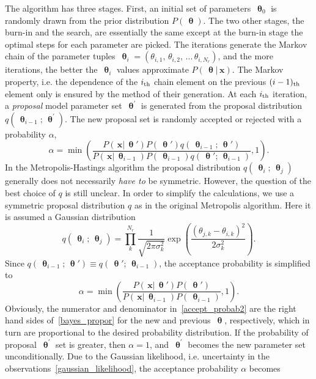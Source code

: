 \documentclass[preprint2]{aastex}
\newcommand{\bfx}{\,\mathbf{x}}
\newcommand{\bfth}{\,\bm{\uptheta}}
\begin{document}
The algorithm has three stages. First, an initial set of parameters $\bfth_0$ is randomly drawn from the prior distribution $P(\bfth)$. The two other stages, the burn-in and the search, are essentially the same except at the burn-in stage the optimal steps for each parameter are picked. The iterations generate the Markov chain of the parameter tuples $\bfth_i = \left(\theta_{i,1},\, \theta_{i,2},\, ...\, \theta_{i,N_r} \right)$, and the more iterations, the better the $\bfth_i$ values approximate $P(\bfth|\bfx)$. The Markov property, i.e. the dependence of the $i_{\rm th}$ chain element on the previous $(i-1)_{\rm th}$ element only is ensured by the method of their generation. At each $i_{\rm th}$ iteration, a \emph{proposal} model parameter set $\bfth^\prime$ is generated from the proposal distribution $q(\bfth_{i-1};\bfth^\prime)$. The new proposal set is randomly accepted or rejected with a probability $\alpha$,
\begin{equation}
  \label{accept_probab}
  \alpha =  \min \left( \frac{P(\bfx|\bfth')P(\bfth')q(\bfth_{i-1};\bfth')} 
            {P(\bfx|\bfth_{i-1})P(\bfth_{i-1})q(\bfth';\bfth_{i-1})}, 1 \right).
\end{equation}
In the Metropolis-Hastings algorithm the proposal distribution $q(\bfth_i;\bfth_j)$ generally does not necessarily \emph{have to} be symmetric. However, the question of the best choice of $q$ is still unclear. In order to simplify the calculations, we use a symmetric proposal distribution $q$ as in the original Metropolis algorithm. Here it is  assumed a Gaussian distribution
\begin{equation}
  \label{gaussian_prop_distr}
  q(\bfth_i;\bfth_j) = \prod^{N_r}_{k} \frac{1}{\sqrt{2 \pi \sigma^2_k}} 
                   \exp \left( \frac{(\theta_{j,k} - \theta_{i,k})^2}{2 \sigma^2_k} \right).
\end{equation}
Since $q(\bfth_{i-1};\bfth') \equiv q(\bfth';\bfth_{i-1})$, the acceptance probability is simplified to
\begin{equation}
  \label{accept_probab2}
  \alpha =  \min \left( \frac{P(\bfx|\bfth')P(\bfth')} {P(\bfx|\bfth_{i-1})P(\bfth_{i-1})}, 1 \right).
\end{equation}
Obviously, the numerator and denominator in~\eqref{accept_probab2} are the right hand sides of~\eqref{bayes_propor} for the new and previous $\bfth$, respectively, which in turn are proportional to the desired probability distribution. If the probability of proposal $\bfth^\prime$ set is greater, then $\alpha = 1$, and $\bfth^\prime$ becomes the new parameter set unconditionally. Due to the Gaussian likelihood, i.e. uncertainty in the observations~\eqref{gaussian_likelihood}, the acceptance probability $\alpha$ becomes
\end{document}
